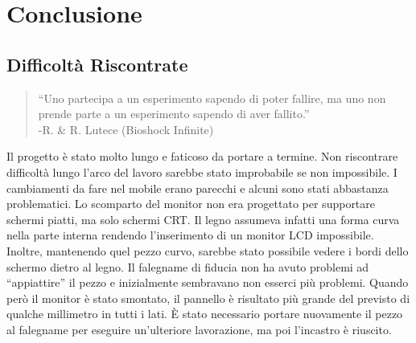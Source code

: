 \chapter{Conclusione}
\section{Difficoltà Riscontrate}
\begin{quotation}\small
“Uno partecipa a un esperimento sapendo di poter fallire, ma uno non prende parte a un esperimento sapendo di aver fallito.”\\-R. \& R. Lutece (Bioshock Infinite)
\end{quotation}
 Il progetto è stato molto lungo e faticoso da portare a termine. Non riscontrare difficoltà lungo l’arco del lavoro sarebbe stato improbabile se non impossibile. I cambiamenti da fare nel mobile erano parecchi e alcuni sono stati abbastanza problematici. Lo scomparto del monitor non era progettato per supportare schermi piatti, ma solo schermi CRT. Il legno assumeva infatti una forma curva nella parte interna rendendo l’inserimento di un monitor LCD impossibile. Inoltre, mantenendo quel pezzo curvo, sarebbe stato possibile vedere i bordi dello schermo dietro al legno. Il falegname di fiducia non ha avuto problemi ad “appiattire” il pezzo e inizialmente sembravano non esserci più problemi. Quando però il monitor è stato smontato, il pannello è risultato più grande del previsto di qualche millimetro in tutti i lati. È stato necessario portare nuovamente il pezzo al falegname per eseguire un’ulteriore lavorazione, ma poi l’incastro è riuscito.
